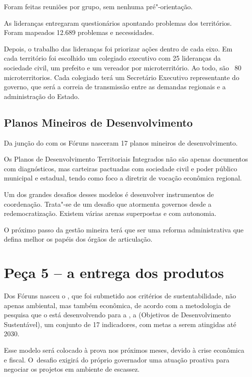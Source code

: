 Foram feitas reuniões por grupo, sem nenhuma pré"-orientação.

As lideranças entregaram questionários apontando problemas dos
territórios. Foram mapeados 12.689 problemas e necessidades.

Depois, o trabalho das lideranças foi priorizar ações dentro de cada
eixo. Em cada território foi escolhido um colegiado executivo com 25
lideranças da sociedade civil, um prefeito e um vereador por
microterritório. Ao todo, são ~80 microterritorios. Cada colegiado terá
um Secretário Executivo representante do governo, que será a correia de
transmissão entre as demandas regionais e a administração do Estado.

\subsection{Planos Mineiros de Desenvolvimento}

Da junção do  com os Fóruns nasceram 17 planos mineiros de
desenvolvimento.

Os Planos de Desenvolvimento Territoriais Integrados não são apenas
documentos com diagnósticos, mas carteiras pactuadas com sociedade civil
e poder público municipal e estadual, tendo como foco a diretriz de
vocação econômica regional.

Um dos grandes desafios desses modelos é desenvolver instrumentos de
coordenação. Trata"-se de um desafio que atormenta governos desde a
redemocratização. Existem várias arenas superpostas e com autonomia.

O próximo passo da gestão mineira terá que ser uma reforma
administrativa que defina melhor os papéis dos órgãos de articulação.

\section{Peça 5 -- a entrega dos produtos}

Dos Fóruns nasceu o , que foi submetido aos critérios de
sustentabilidade, não apenas ambiental, mas também econômica, de acordo
com a metodologia de pesquisa que o  está desenvolvendo para a ,
a  (Objetivos de Desenvolvimento Sustentável), um conjunto de 17
indicadores, com metas a serem atingidas até 2030.

Esse modelo será colocado à prova nos próximos meses, devido à crise
econômica e fiscal. O~desafio exigirá do próprio governador uma atuação
proativa para negociar os projetos em ambiente de escassez.

